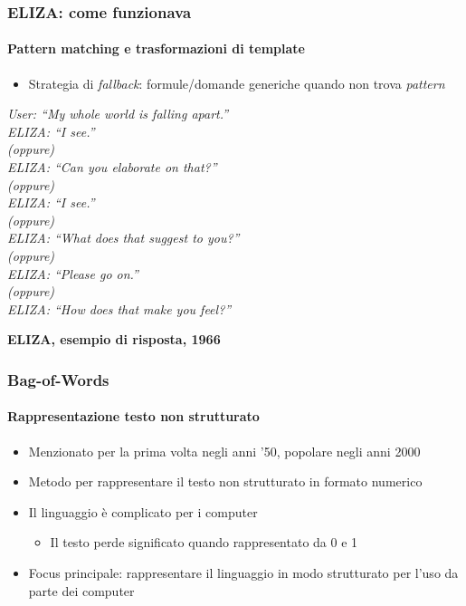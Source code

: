 \begin{frame}[t,fragile] \frametitle{ELIZA: come funzionava}
	\framesubtitle{Pattern matching e trasformazioni di template}
	{\small
		\begin{itemize}[leftmargin=10pt,align=right]
			\item[\alert{\faHandORight}] \alert{Strategia di \textit{fallback}:} formule/domande generiche quando non trova \textit{pattern}
		\end{itemize}
		\vspace*{.3cm}
		\hspace*{4cm}
		\begin{minipage}[t]{.6\textwidth}
			\renewcommand{\epigraphsize}{\scriptsize}
			\setlength{\afterepigraphskip}{0pt}
			\setlength{\beforeepigraphskip}{5pt}
			\setlength{\epigraphwidth}{0.9\textwidth}
			\epigraph{\textit{\alert{User:} ``\alert{My} whole world is falling apart.''\\
			\alert{ELIZA:} ``I see.''\\
			(oppure)\\
			\alert{ELIZA:} ``Can you elaborate on that?''\\
			(oppure)\\
			\alert{ELIZA:} ``I see.''\\
			(oppure)\\
			\alert{ELIZA:} ``What does that suggest to you?''\\
			(oppure)\\
			\alert{ELIZA:} ``Please go on.''\\
			(oppure)\\
			\alert{ELIZA:} ``How does that make you feel?''
			}}{\textbf{ELIZA, esempio di risposta, 1966}}
		\end{minipage}
	}
\end{frame}
%
\begin{frame}[t,fragile] \frametitle{Bag-of-Words}
    \framesubtitle{Rappresentazione testo non strutturato}
	{\small
		\begin{minipage}[t]{\textwidth}
	    	\begin{itemize}[leftmargin=10pt,align=right]
				\onslide<1->\item[\alert{\faHandORight}] Menzionato per la prima volta negli anni '50, popolare negli anni 2000
				\onslide<2->\item[\alert{\faHandORight}] Metodo per rappresentare il testo \alert{non strutturato} in formato numerico
				\onslide<3->\item[\alert{\faHandORight}] Il \alert{linguaggio è complicato} per i computer
				\begin{itemize}[leftmargin=10pt,align=right]
					\item[\alert{\faHandORight}] Il testo perde significato quando rappresentato da 0 e 1
				\end{itemize}
				\item[\alert{\faHandORight}] \alert{Focus principale:} rappresentare il linguaggio in \alert{modo strutturato} per l'uso da parte dei computer
			\end{itemize}
        \end{minipage}
	}
\end{frame}
